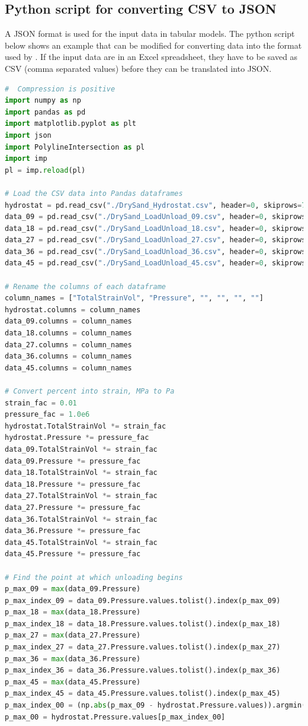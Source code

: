 \subsection{Python script for converting CSV to JSON} \label{app:tabular_elastic_py}
A JSON format is used for the input data in tabular models.  The python script below shows an example
that can be modified for converting data into the  format used
by \Vaango.  If the input data are in an Excel spreadsheet, they have to be saved as CSV
(comma separated values) before they can be translated into JSON.
\begin{lstlisting}[language=Python]
#  Compression is positive
import numpy as np
import pandas as pd
import matplotlib.pyplot as plt
import json
import PolylineIntersection as pl
import imp
pl = imp.reload(pl)

# Load the CSV data into Pandas dataframes
hydrostat = pd.read_csv("./DrySand_Hydrostat.csv", header=0, skiprows=7)
data_09 = pd.read_csv("./DrySand_LoadUnload_09.csv", header=0, skiprows=4)
data_18 = pd.read_csv("./DrySand_LoadUnload_18.csv", header=0, skiprows=4)
data_27 = pd.read_csv("./DrySand_LoadUnload_27.csv", header=0, skiprows=4)
data_36 = pd.read_csv("./DrySand_LoadUnload_36.csv", header=0, skiprows=4)
data_45 = pd.read_csv("./DrySand_LoadUnload_45.csv", header=0, skiprows=4)

# Rename the columns of each dataframe
column_names = ["TotalStrainVol", "Pressure", "", "", "", ""]
hydrostat.columns = column_names
data_09.columns = column_names
data_18.columns = column_names
data_27.columns = column_names
data_36.columns = column_names
data_45.columns = column_names

# Convert percent into strain, MPa to Pa
strain_fac = 0.01
pressure_fac = 1.0e6
hydrostat.TotalStrainVol *= strain_fac
hydrostat.Pressure *= pressure_fac
data_09.TotalStrainVol *= strain_fac
data_09.Pressure *= pressure_fac
data_18.TotalStrainVol *= strain_fac
data_18.Pressure *= pressure_fac
data_27.TotalStrainVol *= strain_fac
data_27.Pressure *= pressure_fac
data_36.TotalStrainVol *= strain_fac
data_36.Pressure *= pressure_fac
data_45.TotalStrainVol *= strain_fac
data_45.Pressure *= pressure_fac

# Find the point at which unloading begins
p_max_09 = max(data_09.Pressure)
p_max_index_09 = data_09.Pressure.values.tolist().index(p_max_09)
p_max_18 = max(data_18.Pressure)
p_max_index_18 = data_18.Pressure.values.tolist().index(p_max_18)
p_max_27 = max(data_27.Pressure)
p_max_index_27 = data_27.Pressure.values.tolist().index(p_max_27)
p_max_36 = max(data_36.Pressure)
p_max_index_36 = data_36.Pressure.values.tolist().index(p_max_36)
p_max_45 = max(data_45.Pressure)
p_max_index_45 = data_45.Pressure.values.tolist().index(p_max_45)
p_max_index_00 = (np.abs(p_max_09 - hydrostat.Pressure.values)).argmin()
p_max_00 = hydrostat.Pressure.values[p_max_index_00]


\end{lstlisting}
